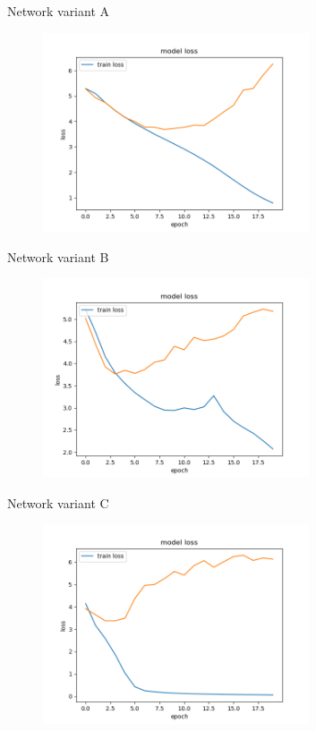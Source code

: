 \documentclass{beamer}
\begin{document}
\begin{frame}
\centering
Network variant A
\begin{figure}[!h]
\centering
\includegraphics[width=0.7\textwidth]{images/run1_loss_a.png}
\end{figure}
\end{frame}

\begin{frame}
\centering
Network variant B
\begin{figure}[!h]
\centering
\includegraphics[width=0.7\textwidth]{images/run1_loss_b.png}
\end{figure}
\end{frame}

\begin{frame}
\centering
Network variant C
\begin{figure}[!h]
\centering
\includegraphics[width=0.7\textwidth]{images/run1_loss_c.png}
\end{figure}
\end{frame}
\end{document}
